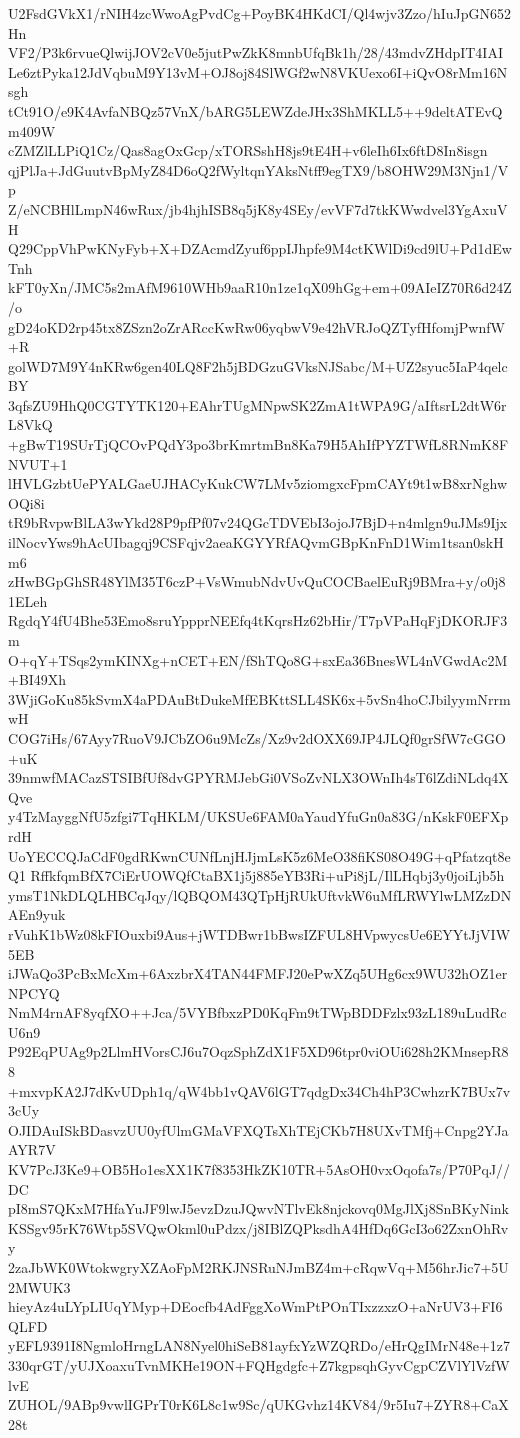 U2FsdGVkX1/rNIH4zcWwoAgPvdCg+PoyBK4HKdCI/Ql4wjv3Zzo/hIuJpGN652Hn
VF2/P3k6rvueQlwijJOV2cV0e5jutPwZkK8mnbUfqBk1h/28/43mdvZHdpIT4IAI
Le6ztPyka12JdVqbuM9Y13vM+OJ8oj84SlWGf2wN8VKUexo6I+iQvO8rMm16Nsgh
tCt91O/e9K4AvfaNBQz57VnX/bARG5LEWZdeJHx3ShMKLL5++9deltATEvQm409W
cZMZlLLPiQ1Cz/Qas8agOxGcp/xTORSshH8js9tE4H+v6leIh6Ix6ftD8In8isgn
qjPlJa+JdGuutvBpMyZ84D6oQ2fWyltqnYAksNtff9egTX9/b8OHW29M3Njn1/Vp
Z/eNCBHlLmpN46wRux/jb4hjhISB8q5jK8y4SEy/evVF7d7tkKWwdvel3YgAxuVH
Q29CppVhPwKNyFyb+X+DZAcmdZyuf6ppIJhpfe9M4ctKWlDi9cd9lU+Pd1dEwTnh
kFT0yXn/JMC5s2mAfM9610WHb9aaR10n1ze1qX09hGg+em+09AIeIZ70R6d24Z/o
gD24oKD2rp45tx8ZSzn2oZrARccKwRw06yqbwV9e42hVRJoQZTyfHfomjPwnfW+R
golWD7M9Y4nKRw6gen40LQ8F2h5jBDGzuGVksNJSabc/M+UZ2syuc5IaP4qelcBY
3qfsZU9HhQ0CGTYTK120+EAhrTUgMNpwSK2ZmA1tWPA9G/aIftsrL2dtW6rL8VkQ
+gBwT19SUrTjQCOvPQdY3po3brKmrtmBn8Ka79H5AhIfPYZTWfL8RNmK8FNVUT+1
lHVLGzbtUePYALGaeUJHACyKukCW7LMv5ziomgxcFpmCAYt9t1wB8xrNghwOQi8i
tR9bRvpwBlLA3wYkd28P9pfPf07v24QGcTDVEbI3ojoJ7BjD+n4mlgn9uJMs9Ijx
ilNocvYws9hAcUIbagqj9CSFqjv2aeaKGYYRfAQvmGBpKnFnD1Wim1tsan0skHm6
zHwBGpGhSR48YlM35T6czP+VsWmubNdvUvQuCOCBaelEuRj9BMra+y/o0j81ELeh
RgdqY4fU4Bhe53Emo8sruYppprNEEfq4tKqrsHz62bHir/T7pVPaHqFjDKORJF3m
O+qY+TSqs2ymKINXg+nCET+EN/fShTQo8G+sxEa36BnesWL4nVGwdAc2M+BI49Xh
3WjiGoKu85kSvmX4aPDAuBtDukeMfEBKttSLL4SK6x+5vSn4hoCJbilyymNrrmwH
COG7iHs/67Ayy7RuoV9JCbZO6u9McZs/Xz9v2dOXX69JP4JLQf0grSfW7cGGO+uK
39nmwfMACazSTSIBfUf8dvGPYRMJebGi0VSoZvNLX3OWnIh4sT6lZdiNLdq4XQve
y4TzMayggNfU5zfgi7TqHKLM/UKSUe6FAM0aYaudYfuGn0a83G/nKskF0EFXprdH
UoYECCQJaCdF0gdRKwnCUNfLnjHJjmLsK5z6MeO38fiKS08O49G+qPfatzqt8eQ1
RffkfqmBfX7CiErUOWQfCtaBX1j5j885eYB3Ri+uPi8jL/IlLHqbj3y0joiLjb5h
ymsT1NkDLQLHBCqJqy/lQBQOM43QTpHjRUkUftvkW6uMfLRWYlwLMZzDNAEn9yuk
rVuhK1bWz08kFIOuxbi9Aus+jWTDBwr1bBwsIZFUL8HVpwycsUe6EYYtJjVIW5EB
iJWaQo3PcBxMcXm+6AxzbrX4TAN44FMFJ20ePwXZq5UHg6cx9WU32hOZ1erNPCYQ
NmM4rnAF8yqfXO++Jca/5VYBfbxzPD0KqFm9tTWpBDDFzlx93zL189uLudRcU6n9
P92EqPUAg9p2LlmHVorsCJ6u7OqzSphZdX1F5XD96tpr0viOUi628h2KMnsepR88
+mxvpKA2J7dKvUDph1q/qW4bb1vQAV6lGT7qdgDx34Ch4hP3CwhzrK7BUx7v3cUy
OJIDAuISkBDasvzUU0yfUlmGMaVFXQTsXhTEjCKb7H8UXvTMfj+Cnpg2YJaAYR7V
KV7PcJ3Ke9+OB5Ho1esXX1K7f8353HkZK10TR+5AsOH0vxOqofa7s/P70PqJ//DC
pI8mS7QKxM7HfaYuJF9lwJ5evzDzuJQwvNTlvEk8njckovq0MgJlXj8SnBKyNink
KSSgv95rK76Wtp5SVQwOkml0uPdzx/j8IBlZQPksdhA4HfDq6GcI3o62ZxnOhRvy
2zaJbWK0WtokwgryXZAoFpM2RKJNSRuNJmBZ4m+cRqwVq+M56hrJic7+5U2MWUK3
hieyAz4uLYpLIUqYMyp+DEocfb4AdFggXoWmPtPOnTIxzzxzO+aNrUV3+FI6QLFD
yEFL9391I8NgmloHrngLAN8Nyel0hiSeB81ayfxYzWZQRDo/eHrQgIMrN48e+1z7
330qrGT/yUJXoaxuTvnMKHe19ON+FQHgdgfc+Z7kgpsqhGyvCgpCZVlYlVzfWlvE
ZUHOL/9ABp9vwlIGPrT0rK6L8c1w9Sc/qUKGvhz14KV84/9r5Iu7+ZYR8+CaX28t
